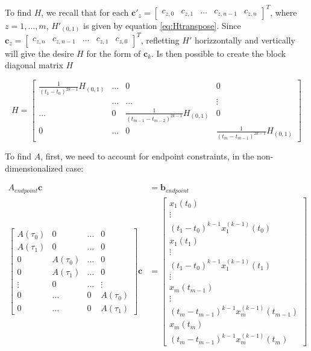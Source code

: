\noindent To find $H$, we recall that for each $\mathbf{c}'_z=\begin{bmatrix}c_{z,0} & c_{z,1} & \dots & c_{z,n-1} & c_{z,n} \end{bmatrix}^T$, where $z=1,\dots,m$, $H'_{(0,1)}$ is given by equation \eqref{eq:Htranspose}. Since $\mathbf{c}_z=\begin{bmatrix}c_{z,n} & c_{z,n-1} & \dots & c_{z,1} & c_{z,0}\end{bmatrix}^T$, refletting $H'$ horizzontally and vertically will give the desire $H$ for the form of $\mathbf{c}_k$. Is then possible to create the block diagonal matrix $H$ 

\begin{equation}
	H = 
	\begin{bmatrix}
		\frac{1}{(t_1-t_0)^{2k-1}}H_{(0,1)} & \dots & 0 & 0 \\
		 & \dots & \dots & \vdots \\
		\dots & 0 & \frac{1}{(t_{m-1}-t_{m-2})^{2k-1}}H_{(0,1)} & 0 \\
		0 & \dots & 0 & \frac{1}{(t_m-t_{m-1})^{2k-1}}H_{(0,1)}
	\end{bmatrix}	
\end{equation}

\noindent To find $A$, first, we need to account for endpoint constraints, in the non-dimensionalized case:

\begin{align}
	A_{endpoint}\mathbf{c} &= \mathbf{b}_{endpoint} \\
	\begin{bmatrix}
		A(\tau_0) & 0         & \dots & 0         \\
		A(\tau_1) & 0         & \dots & 0         \\
		0         & A(\tau_0) & \dots & 0         \\
		0         & A(\tau_1) & \dots & 0         \\
		\vdots    & 0         & \dots & \vdots    \\
		0         & \dots     & 0     & A(\tau_0) \\
		0         & \dots     & 0     & A(\tau_1)            
	\end{bmatrix}
	\mathbf{c} &= 
	\begin{bmatrix}
		x_1(t_0) 								\\
		\vdots   								\\
		(t_1-t_0)^{k-1}x_1^{(k-1)}(t_0) 		\\
		x_1(t_1) 								\\
		\vdots   								\\
		(t_1-t_0)^{k-1}x_1^{(k-1)}(t_1) 		\\
		\vdots   								\\
		x_m(t_{m-1}) 							\\
		\vdots                                  \\
		(t_m-t_{m-1})^{k-1}x_m^{(k-1)}(t_{m-1}) \\
		x_m(t_m)                                \\
		(t_m-t_{m-1})^{k-1}x_m^{(k-1)}(t_m)
	\end{bmatrix} \nonumber
\end{align}

